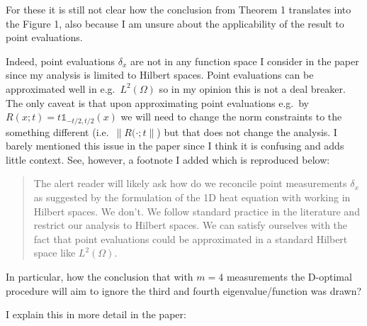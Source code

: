\RC For these it is still not clear how the conclusion from Theorem 1
translates into the Figure 1, also because I am unsure about the
applicability of the result to point evaluations.

\AR Indeed, point evaluations $\delta_x$ are not in any function space
I consider in the paper since my analysis is limited to Hilbert
spaces. Point evaluations can be approximated well in
e.g.~$L^2(\Omega)$ so in my opinion this is not a deal breaker. The
only caveat is that upon approximating point evaluations e.g.~by
$R(x;t) = t\mathbb{1}_{-t/2, t/2}(x)$ we will need to change the norm
constraints to the something different (i.e.~$\|R(\cdot;t\|$) but that
does not change the analysis. I barely mentioned this issue in the
paper since I think it is confusing and adds little context. See,
however, a footnote I added which is reproduced below:
  


\begin{quote}
  The alert reader will likely ask how do we reconcile point
  measurements $\delta_x$ as suggested by the formulation of the 1D
  heat equation with working in Hilbert spaces. We don't. We follow
  standard practice in the literature and restrict our analysis to
  Hilbert spaces. We can satisfy ourselves with the fact that point
  evaluations could be approximated in a standard Hilbert space like
  $L^2(\Omega)$.
\end{quote}
  
\RC In particular, how the conclusion that with $m = 4$ measurements
the D-optimal procedure will aim to ignore the third and fourth
eigenvalue/function was drawn?

\AR I explain this in more detail in the paper:


